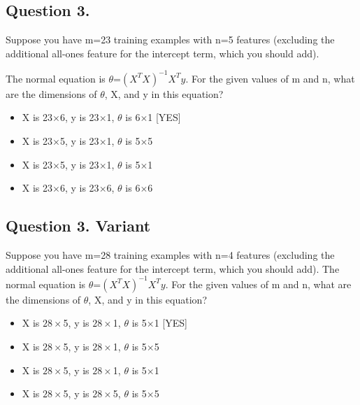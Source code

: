\documentclass[11pt]{article} %
\begin{document}
	\subsection{Question 3.} 
	
	Suppose you have m=23 training examples 
	with n=5 features (excluding the 
	additional all-ones feature for the intercept term, which you should add).
	
	The normal equation is $\theta$=$(X^TX)^{-1}X^{T}y$. For the given values of m and n, 
	what are the dimensions of $\theta$, X, and y in this equation?
	
	\begin{itemize}
		\item X is 23$\times$6, y is 23$\times$1, $\theta$ is 6$\times$1 [YES]
		
		\item X is 23$\times$5, y is 23$\times$1, $\theta$ is 5$\times$5
		
		\item X is 23$\times$5, y is 23$\times$1, $\theta$ is 5$\times$1
		
		\item X is 23$\times$6, y is 23$\times$6, $\theta$ is 6$\times$6
	\end{itemize}
	
	
	
	
		
	\subsection{Question 3. Variant} 
		Suppose you have m=28 training examples with n=4 features (excluding the additional all-ones feature for the intercept term, which you should add). The normal equation is $\theta$=$(X^TX)^{-1}X^{T}y$. For the given values of m and n, 
		what are the dimensions of $\theta$, X, and y in this equation?
		
	\begin{itemize}
		\item X is $ 28 \times$5, y is $ 28 \times$1, $\theta$ is 5$\times$1 [YES]
		
		\item X is $ 28 \times$5, y is $ 28 \times$1, $\theta$ is 5$\times$5
		
		\item X is $ 28 \times$5, y is $ 28 \times$1, $\theta$ is 5$\times$1
		
		\item X is $ 28 \times$5, y is $ 28 \times$5, $\theta$ is 5$\times$5
	\end{itemize}
	
\end{document}
